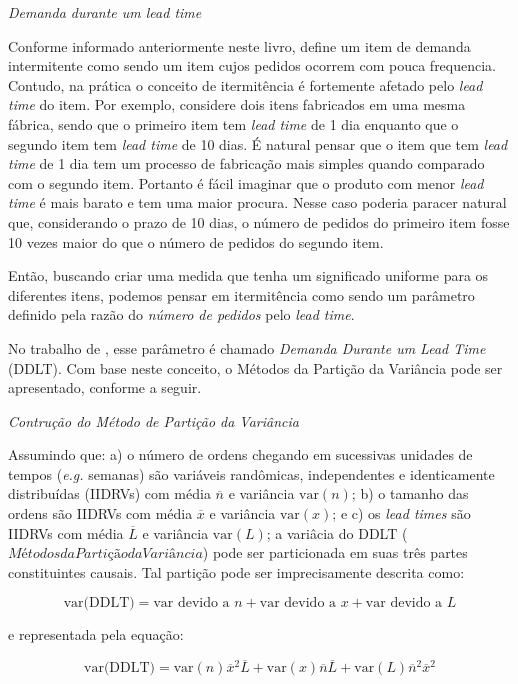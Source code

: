 \documentclass{book}
\begin{document}
\emph{Demanda durante um lead time}

Conforme informado anteriormente neste livro, \cite{BoylanEtAl2008} define um item de demanda intermitente como sendo um item cujos pedidos ocorrem com pouca frequencia. Contudo, na prática o conceito de itermitência é fortemente afetado pelo \emph{lead time} do item. Por exemplo, considere dois itens fabricados em uma mesma fábrica, sendo que o primeiro item tem \emph{lead time} de 1 dia enquanto que o segundo item tem \emph{lead time} de 10 dias. É natural pensar que o item que tem \emph{lead time} de 1 dia tem um processo de fabricação mais simples quando comparado com o segundo item. Portanto é fácil imaginar que o produto com menor \emph{lead time} é mais barato e tem uma maior procura. Nesse caso poderia paracer natural que, considerando o prazo de 10 dias, o número de pedidos do primeiro item fosse 10 vezes maior do que o número de pedidos do segundo item. 

Então, buscando criar uma medida que tenha um significado uniforme para os diferentes itens, podemos pensar em itermitência como sendo um parâmetro definido pela razão do \emph{número de pedidos} pelo \emph{lead time}.   

No trabalho de \cite{Williams1984}, esse parâmetro é chamado \emph{Demanda Durante um Lead Time} (DDLT). Com base neste conceito, o Métodos da Partição da Variância pode ser apresentado, conforme a seguir.

\emph{Contrução do Método de Partição da Variância}

Assumindo que: a) o número de ordens chegando em sucessivas unidades de tempos (\emph{e.g.} semanas) são variáveis randômicas, independentes e identicamente distribuídas (IIDRVs) com média $\overline{n}$ e variância $\textrm{var}(n)$; b) o tamanho das ordens são IIDRVs com média $\overline{x}$ e variância $\textrm{var}(x)$; e c) os \emph{lead times} são IIDRVs com média $\overline{L}$ e variância $\textrm{var}(L)$; a variâcia do DDLT ($Métodos da Partição da Variância$) pode ser particionada em suas três partes constituintes causais. Tal partição pode ser imprecisamente descrita como:

\begin{equation}
\textrm{var(DDLT)} = \textrm{var devido a } n + \textrm{var devido a } x + \textrm{var devido a } L
\end{equation}

e representada pela equação:

\begin{equation}
\textrm{var(DDLT)} = \textrm{var}(n) \overline{x}^2 \overline{L}   + \textrm{var}(x) \overline{n} \overline{L} + \textrm{var}(L) \overline{n}^2 \overline{x}^2
\end{equation}
\end{document}
